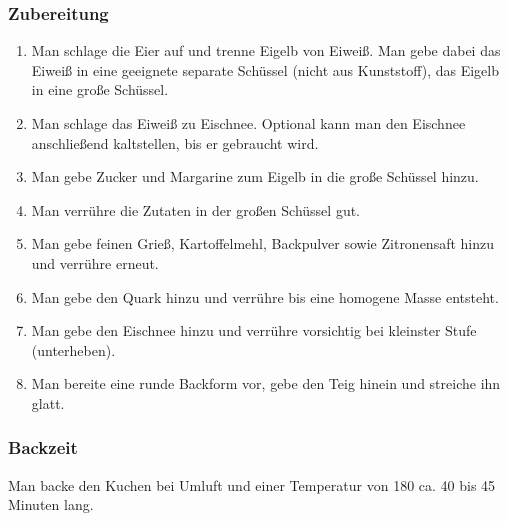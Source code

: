 \documentclass[a4paper]{book}
\begin{document}
\subsubsection{Zubereitung}
\begin{enumerate}[(1)]
	\item Man schlage die Eier auf und trenne Eigelb von Eiweiß. Man gebe dabei das Eiweiß in eine geeignete separate Schüssel (nicht aus Kunststoff), das Eigelb in eine große Schüssel.
	\item Man schlage das Eiweiß zu Eischnee. Optional kann man den Eischnee anschließend kaltstellen, bis er gebraucht wird.
	\item Man gebe Zucker und Margarine zum Eigelb in die große Schüssel hinzu.
	\item Man verrühre die Zutaten in der großen Schüssel gut.
	\item Man gebe feinen Grieß, Kartoffelmehl, Backpulver sowie Zitronensaft hinzu und verrühre erneut.
	\item Man gebe den Quark hinzu und verrühre bis eine homogene Masse entsteht.
	\item Man gebe den Eischnee hinzu und verrühre vorsichtig bei kleinster Stufe (unterheben).
	\item Man bereite eine runde Backform vor, gebe den Teig hinein und streiche ihn glatt.
\end{enumerate}
\subsubsection{Backzeit}
	Man backe den Kuchen bei Umluft und einer Temperatur von 180{\textcelsius} ca. 40 bis 45 Minuten lang.
\end{document}
